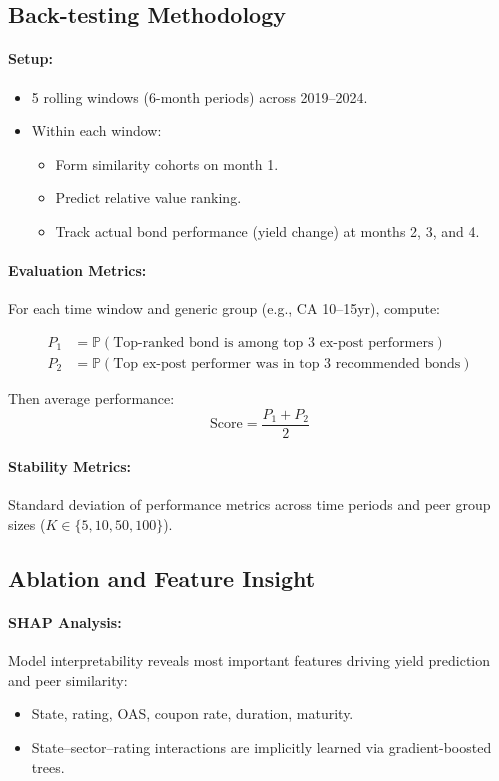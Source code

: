 \documentclass{article}
\begin{document}
\subsection*{Back-testing Methodology}

\paragraph{Setup:}
\begin{itemize}[nosep]
    \item 5 rolling windows (6-month periods) across 2019–2024.
    \item Within each window:
        \begin{itemize}[nosep]
            \item Form similarity cohorts on month 1.
            \item Predict relative value ranking.
            \item Track actual bond performance (yield change) at months 2, 3, and 4.
        \end{itemize}
\end{itemize}

\paragraph{Evaluation Metrics:}

For each time window and generic group (e.g., CA 10–15yr), compute:

\begin{align*}
    P_1 &= \mathbb{P}(\text{Top-ranked bond is among top 3 ex-post performers}) \\
    P_2 &= \mathbb{P}(\text{Top ex-post performer was in top 3 recommended bonds})
\end{align*}

Then average performance:
\[
\text{Score} = \frac{P_1 + P_2}{2}
\]

\paragraph{Stability Metrics:}
Standard deviation of performance metrics across time periods and peer group sizes ($K \in \{5, 10, 50, 100\}$).

\subsection*{Ablation and Feature Insight}

\paragraph{SHAP Analysis:}
Model interpretability reveals most important features driving yield prediction and peer similarity:
\begin{itemize}[nosep]
    \item State, rating, OAS, coupon rate, duration, maturity.
    \item State–sector–rating interactions are implicitly learned via gradient-boosted trees.
\end{itemize}
\end{document}
